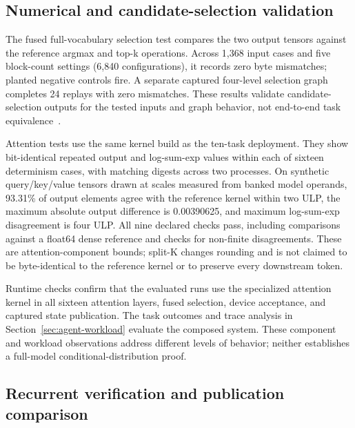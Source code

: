 \documentclass[conference]{IEEEtran}
\begin{document}
\subsection{Numerical and candidate-selection validation}
\label{sec:current-validation}




The fused full-vocabulary selection test compares the two output tensors against the reference argmax and top-k operations. Across 1,368 input cases and five block-count settings (6,840 configurations), it records zero byte mismatches; planted negative controls fire. A separate captured four-level selection graph completes 24 replays with zero mismatches. These results validate candidate-selection outputs for the tested inputs and graph behavior, not end-to-end task equivalence~\cite{lumo2026archive}.

Attention tests use the same kernel build as the ten-task deployment. They show bit-identical repeated output and log-sum-exp values within each of sixteen determinism cases, with matching digests across two processes. On synthetic query/key/value tensors drawn at scales measured from banked model operands, 93.31\% of output elements agree with the reference kernel within two ULP, the maximum absolute output difference is 0.00390625, and maximum log-sum-exp disagreement is four ULP. All nine declared checks pass, including comparisons against a float64 dense reference and checks for non-finite disagreements. These are attention-component bounds; split-K changes rounding and is not claimed to be byte-identical to the reference kernel or to preserve every downstream token.

Runtime checks confirm that the evaluated runs use the specialized attention kernel in all sixteen attention layers, fused selection, device acceptance, and captured state publication. The task outcomes and trace analysis in Section~\ref{sec:agent-workload} evaluate the composed system. These component and workload observations address different levels of behavior; neither establishes a full-model conditional-distribution proof.

\subsection{Recurrent verification and publication comparison}
\label{sec:m1-qualification}

\end{document}
